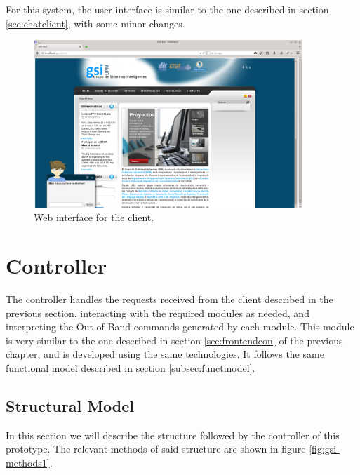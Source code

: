 For this system, the user interface is similar to the one described in section \ref{sec:chatclient}, with some minor changes. 

\begin{figure}[!htbp]
    \centering
    \includegraphics[width=0.9\textwidth]{img/screens/gsi-client.png}
    \caption{Web interface for the client.}
    \label{fig:gsichat1}
\end{figure}

\section{Controller}
\label{sec:controllergsi}

The controller handles the requests received from the client described in the previous section, interacting with the required modules as needed, and interpreting the Out of Band commands generated by each module. This module is very similar to the one described in section \ref{sec:frontendcon} of the previous chapter, and is developed using the same technologies. It follows the same functional model described in section \ref{subsec:functmodel}.

\subsection{Structural Model}

In this section we will describe the structure followed by the controller of this prototype. The relevant methods of said structure are shown in figure \ref{fig:gsi-methods1}.

